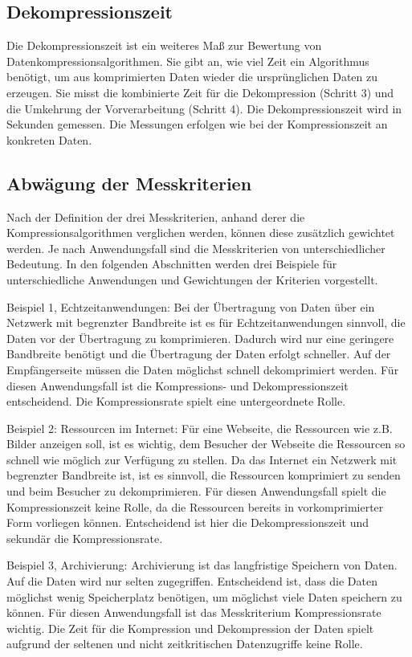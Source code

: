 \documentclass[conference]{IEEEtran}
\begin{document}
\subsection{Dekompressionszeit}

Die Dekompressionszeit ist ein weiteres Maß zur Bewertung von 
Datenkompressionsalgorithmen. 
Sie gibt an, wie viel Zeit ein Algorithmus benötigt, um aus komprimierten Daten 
wieder die ursprünglichen Daten zu erzeugen. 
Sie misst die kombinierte Zeit für die Dekompression (Schritt 3) und die Umkehrung 
der Vorverarbeitung (Schritt 4). Die Dekompressionszeit wird in Sekunden gemessen. 
Die Messungen erfolgen wie bei der Kompressionszeit an konkreten Daten.


\subsection{Abwägung der Messkriterien}

Nach der Definition der drei Messkriterien, anhand derer die Kompressionsalgorithmen 
verglichen werden, können diese zusätzlich gewichtet werden. 
Je nach Anwendungsfall sind die Messkriterien von unterschiedlicher Bedeutung. 
In den folgenden Abschnitten werden drei Beispiele für unterschiedliche Anwendungen 
und Gewichtungen der Kriterien vorgestellt.

Beispiel 1, Echtzeitanwendungen:
Bei der Übertragung von Daten über ein Netzwerk mit begrenzter Bandbreite ist es für 
Echtzeitanwendungen sinnvoll, die Daten vor der Übertragung zu komprimieren.
Dadurch wird nur eine geringere Bandbreite benötigt und die Übertragung der
Daten erfolgt schneller.
Auf der Empfängerseite müssen die Daten möglichst schnell dekomprimiert werden.
Für diesen Anwendungsfall ist die Kompressions- und Dekompressionszeit entscheidend.
Die Kompressionsrate spielt eine untergeordnete Rolle.

Beispiel 2: Ressourcen im Internet: 
Für eine Webseite, die Ressourcen wie z.B. Bilder anzeigen soll, ist es 
wichtig, dem Besucher der Webseite die Ressourcen so schnell wie möglich zur 
Verfügung zu stellen. 
Da das Internet ein Netzwerk mit begrenzter Bandbreite ist, ist es sinnvoll, die 
Ressourcen komprimiert zu senden und beim Besucher zu dekomprimieren. 
Für diesen Anwendungsfall spielt die Kompressionszeit keine Rolle, da die Ressourcen 
bereits in vorkomprimierter Form vorliegen können. 
Entscheidend ist hier die Dekompressionszeit und sekundär die Kompressionsrate.

Beispiel 3, Archivierung:
Archivierung ist das langfristige Speichern von Daten.
Auf die Daten wird nur selten zugegriffen.
Entscheidend ist, dass die Daten möglichst wenig Speicherplatz benötigen,
um möglichst viele Daten speichern zu können.
Für diesen Anwendungsfall ist das Messkriterium Kompressionsrate wichtig.
Die Zeit für die Kompression und Dekompression der Daten spielt aufgrund der 
seltenen und nicht zeitkritischen Datenzugriffe keine Rolle.
\end{document}
